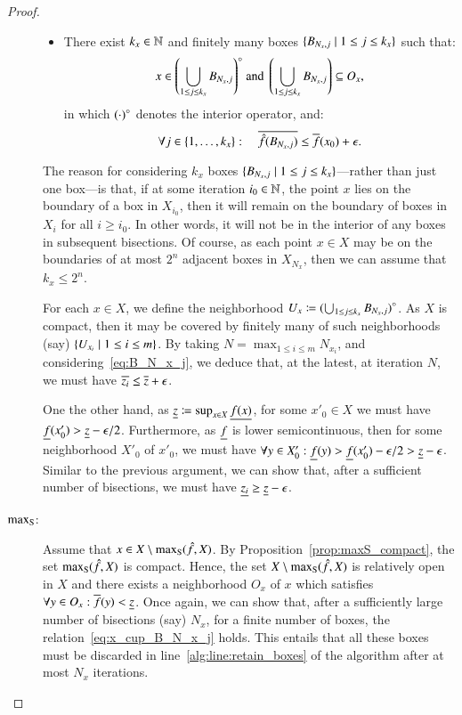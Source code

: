 \documentclass[11pt,times]{article}
\begin{document}
\begin{proof}
\begin{description}
  
\begin{itemize}
\item There exist $k_x \in \N$ and finitely many boxes
  $\setbarNormal{B_{N_x, j}}{ 1 \leq j \leq k_x}$ such that:
  \begin{equation}
    \label{eq:x_cup_B_N_x_j}
    x \in \interiorOf{\left(\bigcup_{1 \leq j \leq k_x} B_{N_x,
          j}\right)} \text{ and } \left(\bigcup_{1 \leq j \leq k_x} B_{N_x, j}\right) \subseteq O_x,     
  \end{equation}
  \noindent
  in which $\interiorOf{(\cdot)}$ denotes the interior operator, and:
  \begin{equation}
    \label{eq:B_N_x_j}
    \forall j \in \set{1, \ldots, k_x}: \quad    \uep[\hat{f}(B_{N_x, j})] \leq \uep[f](x_0) +
    \epsilon.  
  \end{equation}
\end{itemize}
%
The reason for considering $k_x$ boxes
$\setbarNormal{B_{N_x, j}}{ 1 \leq j \leq k_x}$---rather than just one
box---is that, if at some iteration $i_0 \in \N$, the point $x$ lies
on the boundary of a box in $X_{i_0}$, then it will remain on the
boundary of boxes in $X_i$ for all $i \geq i_0$. In other words, it
will not be in the interior of any boxes in subsequent bisections. Of
course, as each point $x \in X$ may be on the boundaries of at most
$2^n$ adjacent boxes in $X_{N_x}$, then we can assume that
$k_x \leq 2^n$.

For each $x \in X$, we define the neighborhood
$U_x \defeq \interiorOf{(\bigcup_{1 \leq j \leq k_x} B_{N_x, j})}$. As
$X$ is compact, then it may be covered by finitely many of such
neighborhoods (say) $\setbarNormal{U_{x_i}}{1 \leq i \leq m}$. By
taking $N = \max_{1 \leq i \leq m} N_{x_i}$, and
considering~\eqref{eq:B_N_x_j}, we deduce that, at the latest, at
iteration $N$, we must have $\uep[z_i] \leq \uep[z] + \epsilon$.


One the other hand, as $\lep[z] \defeq \sup_{x \in X} \lep[f(x)]$, for
some $x'_0 \in X$ we must have $\lep[f](x'_0) > \lep[z] -
\epsilon/2$. Furthermore, as $\lep[f]$ is lower semicontinuous, then
for some neighborhood $X'_0$ of $x'_0$, we must have
$\forall y \in X'_0: \lep[f](y) > \lep[f](x'_0) - \epsilon/2 > \lep[z]
- \epsilon$. Similar to the previous argument, we can show that, after
a sufficient number of bisections, we must have
$\lep[z_i] \geq \lep[z] - \epsilon$.

\item[$\maxS$:] Assume that $x \in X \setminus \maxS(\hat{f},X)$. By
  Proposition~\ref{prop:maxS_compact}, the set $\maxS(\hat{f},X)$ is
  compact. Hence, the set $X \setminus \maxS(\hat{f},X)$ is relatively
  open in $X$ and there exists a neighborhood $O_x$ of $x$ which
  satisfies $\forall y \in O_x: \uep[f](y) < \lep[z]$. Once again, we
  can show that, after a sufficiently large number of bisections (say)
  $N_x$, for a finite number of boxes, the
  relation~\eqref{eq:x_cup_B_N_x_j} holds. This entails that all these
  boxes must be discarded in line~\ref{alg:line:retain_boxes} of the
  algorithm after at most $N_x$ iterations.
\end{description}
\end{proof}
\end{document}
